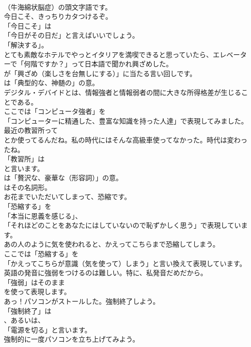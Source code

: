 \documentclass[8pt]{extreport}
\begin{document}
\begin{CJK}{UTF8}{min}
\\	（牛海綿状脳症）の頭文字語です。	
\\	今日こそ、きっちりカタつけるぞ。 
\\	「今日こそ」は
\\	「今日がその日だ」と言えばいいでしょう。
\\	「解決する」。	
\\	とても素敵なホテルでやっとイタリアを満喫できると思っていたら、エレベーターで「何階ですか？」って日本語で聞かれ興ざめした。 
\\	が「興ざめ（楽しさを台無しにする）」に当たる言い回しです。
\\	は「典型的な、神髄の」の意。	
\\	デジタル・デバイドとは、情報強者と情報弱者の間に大きな所得格差が生じることである。 
\\	ここでは「コンピュータ強者」を
\\	「コンピューターに精通した、豊富な知識を持った人達」で表現してみました。	
\\	最近の教習所って
\\	とか使ってるんだね。私の時代にはそんな高級車使ってなかった。時代は変わったね。 
\\	「教習所」は
\\	と言います。
\\	は「贅沢な、豪華な（形容詞）」の意。
\\	はその名詞形。	
\\	お花までいただいてしまって、恐縮です。 
\\	「恐縮する」を
\\	「本当に恩義を感じる」、
\\	「それほどのことをあなたにはしていないので恥ずかしく思う」で表現しています。	
\\	あの人のように気を使われると、かえってこちらまで恐縮してしまう。 
\\	ここでは「恐縮する」を
\\	「かえってこちらが意識（気を使って）しまう」と言い換えて表現しています。	
\\	英語の発音に強弱をつけるのは難しい。特に、私発音だめだから。 
\\	「強弱」はそのまま
\\	を使って表現します。	
\\	あっ！パソコンがストールした。強制終了しよう。 
\\	「強制終了」は
\\	、あるいは、
\\	「電源を切る」と言います。	
\\	強制的に一度パソコンを立ち上げてみよう。 

\end{CJK}
\end{document}
